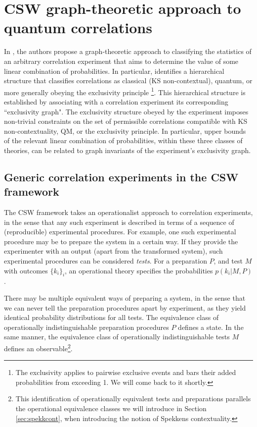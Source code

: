 \chapter{CSW graph-theoretic approach to quantum correlations}
\label{sec:csw}

In \cite{Cabello2014}, the authors propose a graph-theoretic approach to classifying the statistics of an arbitrary correlation experiment that aims to determine the value of some linear combination of probabilities. In particular, \cite{Cabello2014} identifies a hierarchical structure that classifies correlations as classical (KS non-contextual), quantum, or more generally obeying the exclusivity principle \footnote{The exclusivity applies to pairwise exclusive events and bars their added probabilities from exceeding 1. We will come back to it shortly.}. This hierarchical structure is established by associating with a correlation experiment its corresponding ``exclusivity graph". The exclusivity structure obeyed by the experiment imposes non-trivial constraints on the set of permissible correlations compatible with KS non-contextuality, QM, or the exclusivity principle. In particular, upper bounds of the relevant linear combination of probabilities, within these three classes of theories, can be related to graph invariants of the experiment's exclusivity graph.

\section{Generic correlation experiments in the CSW framework}
\label{sec:correxp}
The CSW framework takes an operationalist approach to correlation experiments, in the sense that any such experiment is described in terms of a sequence of (reproducible) experimental procedures. For example, one such experimental procedure may be to prepare the system in a certain way. If they provide the experimenter with an output (apart from the transformed system), such experimental procedures can be considered \emph{tests}. For a preparation $P$, and test $M$ with outcomes $\{k_i\}_i$, an operational theory specifies the probabilities $p(k_i\vert M,P)$. 

There may be multiple equivalent ways of preparing a system, in the sense that we can never tell the preparation procedures apart by experiment, as they yield identical probability distributions for all tests. The equivalence class of operationally indistinguishable preparation procedures $P$ defines a state. In the same manner, the equivalence class of operationally indistinguishable tests $M$ defines an observable\footnote{This identification of operationally equivalent tests and preparations parallels the operational equivalence classes we will introduce in Section \ref{sec:spekkcont}, when introducing the notion of  Spekkens contextuality.}.

